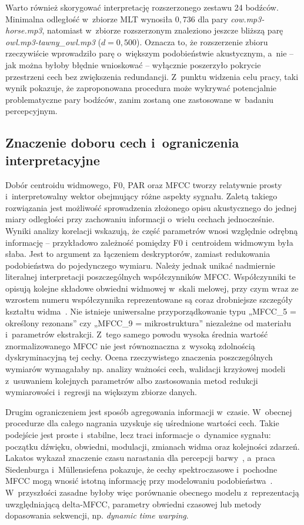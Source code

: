 \documentclass{article}
\begin{document}
Warto również skorygować interpretację rozszerzonego zestawu 24 bodźców. Minimalna odległość w~zbiorze MLT wynosiła $0{,}736$ dla pary \textit{cow.mp3-horse.mp3}, natomiast w~zbiorze rozszerzonym znaleziono jeszcze bliższą parę \textit{owl.mp3-tawny\_owl.mp3} ($d = 0{,}500$). Oznacza to, że rozszerzenie zbioru rzeczywiście wprowadziło parę o~większym podobieństwie akustycznym, a~nie -- jak można byłoby błędnie wnioskować -- wyłącznie poszerzyło pokrycie przestrzeni cech bez zwiększenia redundancji. Z~punktu widzenia celu pracy, taki wynik pokazuje, że zaproponowana procedura może wykrywać potencjalnie problematyczne pary bodźców, zanim zostaną one zastosowane w~badaniu percepcyjnym.

\subsection{Znaczenie doboru cech i~ograniczenia interpretacyjne}

Dobór centroidu widmowego, F0, PAR oraz MFCC tworzy relatywnie prosty i~interpretowalny wektor obejmujący różne aspekty sygnału. Zaletą takiego rozwiązania jest możliwość sprowadzenia złożonego opisu akustycznego do jednej miary odległości przy zachowaniu informacji o~wielu cechach jednocześnie. Wyniki analizy korelacji wskazują, że część parametrów wnosi względnie odrębną informację -- przykładowo zależność pomiędzy F0 i~centroidem widmowym była słaba. Jest to argument za łączeniem deskryptorów, zamiast redukowania podobieństwa do pojedynczego wymiaru. Należy jednak unikać nadmiernie literalnej interpretacji poszczególnych współczynników MFCC. Współczynniki te opisują kolejne składowe obwiedni widmowej w~skali melowej, przy czym wraz ze wzrostem numeru współczynnika reprezentowane są coraz drobniejsze szczegóły kształtu widma~\cite{Siedenburg2017TimbreSimilarity}. Nie istnieje uniwersalne przyporządkowanie typu „MFCC\_5 = określony rezonans” czy „MFCC\_9 = mikrostruktura” niezależne od materiału i~parametrów ekstrakcji. Z~tego samego powodu wysoka średnia wartość znormalizowanego MFCC nie jest równoznaczna z~wysoką zdolnością dyskryminacyjną tej cechy. Ocena rzeczywistego znaczenia poszczególnych wymiarów wymagałaby np. analizy ważności cech, walidacji krzyżowej modeli z~usuwaniem kolejnych parametrów albo zastosowania metod redukcji wymiarowości i~regresji na większym zbiorze danych.

Drugim ograniczeniem jest sposób agregowania informacji w~czasie. W~obecnej procedurze dla całego nagrania uzyskuje się uśrednione wartości cech. Takie podejście jest proste i~stabilne, lecz traci informacje o~dynamice sygnału: początku dźwięku, obwiedni, modulacji, zmianach widma oraz kolejności zdarzeń. Lakatos wykazał znaczenie czasu narastania dla percepcji barwy~\cite{Lakatos2000Timbre}, a~praca Siedenburga i~Müllensiefena pokazuje, że cechy spektroczasowe i~pochodne MFCC mogą wnosić istotną informację przy modelowaniu podobieństwa~\cite{Siedenburg2017TimbreSimilarity}. W~przyszłości zasadne byłoby więc porównanie obecnego modelu z~reprezentacją uwzględniającą delta-MFCC, parametry obwiedni czasowej lub metody dopasowania sekwencji, np. \textit{dynamic time warping}.
\end{document}
